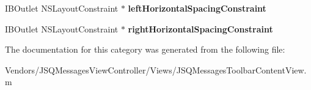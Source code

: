 \begin{DoxyCompactItemize}
\item 
\hypertarget{category_j_s_q_messages_toolbar_content_view_07_08_a20d8d07a1d4ba4fc72921b33493a8ad9}{}I\+B\+Outlet N\+S\+Layout\+Constraint $\ast$ {\bfseries left\+Horizontal\+Spacing\+Constraint}\label{category_j_s_q_messages_toolbar_content_view_07_08_a20d8d07a1d4ba4fc72921b33493a8ad9}

\item 
\hypertarget{category_j_s_q_messages_toolbar_content_view_07_08_acb1a21dabef626dc13258e254653e86a}{}I\+B\+Outlet N\+S\+Layout\+Constraint $\ast$ {\bfseries right\+Horizontal\+Spacing\+Constraint}\label{category_j_s_q_messages_toolbar_content_view_07_08_acb1a21dabef626dc13258e254653e86a}

\end{DoxyCompactItemize}


The documentation for this category was generated from the following file\+:\begin{DoxyCompactItemize}
\item 
Vendors/\+J\+S\+Q\+Messages\+View\+Controller/\+Views/J\+S\+Q\+Messages\+Toolbar\+Content\+View.\+m\end{DoxyCompactItemize}
